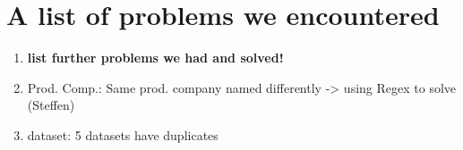 
\section{A list of problems we encountered}
\begin{enumerate}
	\item \textbf{list further problems we had and solved!}
	\item Prod. Comp.: Same prod. company named differently -> using Regex to solve (Steffen)
	\item dataset: 5 datasets have duplicates
\end{enumerate}
